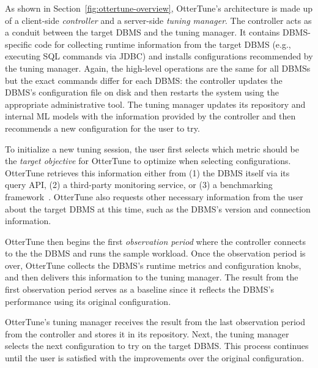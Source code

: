 \documentclass[11pt,times]{article}
\newcommand{\ottertune}{OtterTune\xspace}
\begin{document}
As shown in Section~\ref{fig:ottertune-overview}, \ottertune's architecture is made up of a client-side 
\textit{controller} and a server-side
\textit{tuning manager}. The controller acts as a conduit between the target
DBMS and the tuning manager. It contains DBMS-specific code for collecting runtime information from 
the target DBMS (e.g., executing SQL commands via JDBC) and installs configurations recommended by 
the tuning manager. Again, the high-level operations are the same for all DBMSs but the 
exact commands differ for each DBMS: the controller updates the DBMS's configuration file 
on disk and then restarts the system using the appropriate administrative tool.
The tuning manager updates its repository and internal ML models with the information provided by 
the controller and then recommends a new configuration for the user to try.

To initialize a new tuning session, the user first selects which metric should be the 
\textit{target objective} for \ottertune to optimize when selecting configurations. 
\ottertune retrieves this information either from (1) the DBMS itself via its query API, (2) 
a third-party monitoring service, or (3) a benchmarking framework~\cite{difallah13}.
\ottertune also requests other necessary
information from the user about the target DBMS at this time, such as the DBMS's version
and connection information.

\ottertune then begins the first \textit{observation period} where the controller connects to the 
the DBMS and runs the sample workload. Once the observation period 
is over, \ottertune collects the DBMS's runtime metrics and configuration knobs, and then 
delivers this information to the tuning manager. 
The result from the first observation period serves as a baseline since it reflects
the DBMS's performance using its original configuration.

\ottertune's tuning manager receives the result from the last observation period from the 
controller and
stores it in its repository. Next, the tuning manager selects the next configuration to try on the 
target DBMS. This process
continues until the user is satisfied with the improvements over the original configuration.
\end{document}

